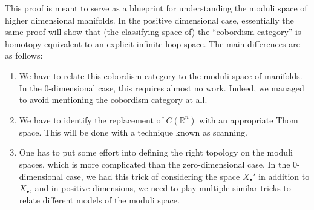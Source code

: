 \documentclass{shortart}
\theoremstyle{definition}
\newcommand\R{\mathbb{R}}
\begin{document}
This proof is meant to serve as a blueprint for understanding the moduli space of higher dimensional manifolds. In the positive dimensional case, essentially the same proof will show that (the classifying space of) the ``cobordism category'' is homotopy equivalent to an explicit infinite loop space. The main differences are as follows:
\begin{enumerate}
  \item We have to relate this cobordism category to the moduli space of manifolds. In the $0$-dimensional case, this requires almost no work. Indeed, we managed to avoid mentioning the cobordism category at all.
  \item We have to identify the replacement of $C(\R^n)$ with an appropriate Thom space. This will be done with a technique known as scanning.
  \item One has to put some effort into defining the right topology on the moduli spaces, which is more complicated than the zero-dimensional case. In the $0$-dimensional case, we had this trick of considering the space $X_\bullet'$ in addition to $X_\bullet$, and in positive dimensions, we need to play multiple similar tricks to relate different models of the moduli space.
\end{enumerate}
\end{document}
